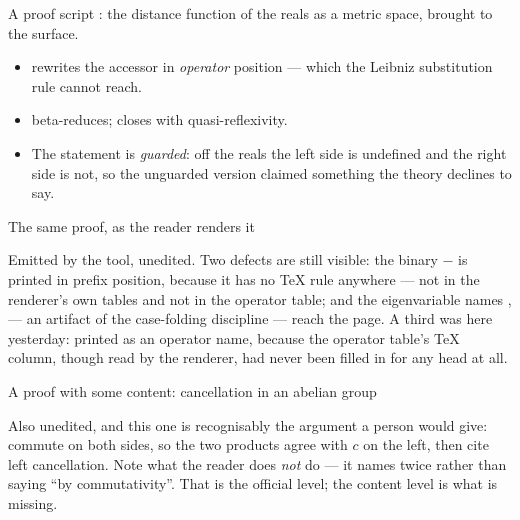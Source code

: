\documentclass[11pt,aspectratio=169]{beamer}
\begin{document}
\begin{frame}[fragile]{A proof script}
  : the distance function of the reals as a metric space,
  brought to the surface.
  \begin{itemize}\small
    \item {} rewrites the accessor in \emph{operator} position ---
          which the Leibniz substitution rule cannot reach.
    \item {} beta-reduces;  closes with quasi-reflexivity.
    \item The statement is \emph{guarded}: off the reals the left side is
          undefined and the right side is not, so the unguarded version claimed
          something the theory declines to say.
  \end{itemize}
\end{frame}

\begin{frame}{The same proof, as the reader renders it}
  \begin{center}
    \scriptsize
    
  \end{center}
  \vfill
  \footnotesize
  Emitted by the tool, unedited. Two defects are still visible: the binary
  $-$ is printed in prefix position, because it has no \TeX{} rule anywhere ---
  not in the renderer's own tables and not in the operator table; and the
  eigenvariable names ,  --- an artifact of the
  case-folding discipline --- reach the page. A third was here yesterday:
  \code{==} printed as an operator name, because the operator table's \TeX{}
  column, though read by the renderer, had never been filled in for any head
  at all.
\end{frame}

\begin{frame}[shrink=10]{A proof with some content: cancellation in an abelian group}
  \begin{center}
    \scriptsize
    
  \end{center}
  \vfill
  \footnotesize
  Also unedited, and this one is recognisably the argument a person would give:
  commute on both sides, so the two products agree with $c$ on the left, then
  cite left cancellation. Note what the reader does \emph{not} do --- it names
   twice rather than saying ``by commutativity''.
  That is the official level; the content level is what is missing.
\end{frame}
\end{document}
